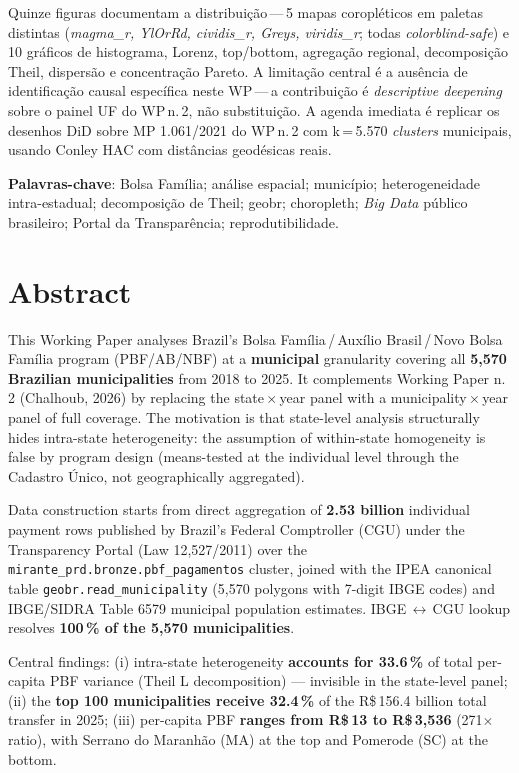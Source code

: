 \documentclass[12pt,a4paper,oneside]{article}
\begin{document}
Quinze figuras documentam a distribuição\,---\,5 mapas coropléticos em paletas
distintas (\textit{magma\_r, YlOrRd, cividis\_r, Greys, viridis\_r}; todas
\textit{colorblind-safe}) e 10 gráficos de histograma, Lorenz, top/bottom,
agregação regional, decomposição Theil, dispersão e concentração Pareto. A
limitação central é a ausência de identificação causal específica neste
WP\,---\,a contribuição é \textit{descriptive deepening} sobre o painel UF do
WP\,n.\,2, não substituição. A agenda imediata é replicar os desenhos DiD
sobre MP 1.061/2021 do WP\,n.\,2 com k\,=\,5.570 \textit{clusters}
municipais, usando Conley HAC com distâncias geodésicas reais.

\smallskip
\noindent\textbf{Palavras-chave}: Bolsa Família; análise espacial; município;
heterogeneidade intra-estadual; decomposição de Theil; geobr; choropleth;
\textit{Big Data} público brasileiro; Portal da Transparência;
reprodutibilidade.

\section*{Abstract}

This Working Paper analyses Brazil's Bolsa Família\,/\,Auxílio
Brasil\,/\,Novo Bolsa Família program (PBF/AB/NBF) at a \textbf{municipal}
granularity covering all \textbf{5{,}570 Brazilian municipalities} from
2018 to 2025. It complements Working Paper n.\,2 (Chalhoub, 2026) by
replacing the state\,$\times$\,year panel with a municipality\,$\times$\,year
panel of full coverage. The motivation is that state-level analysis
structurally hides intra-state heterogeneity: the assumption of within-state
homogeneity is false by program design (means-tested at the individual level
through the Cadastro Único, not geographically aggregated).

Data construction starts from direct aggregation of \textbf{2.53 billion}
individual payment rows published by Brazil's Federal Comptroller (CGU)
under the Transparency Portal (Law 12,527/2011) over the
\texttt{mirante\_prd.bronze.pbf\_pagamentos} cluster, joined with the IPEA
canonical table \texttt{geobr.read\_municipality} (5{,}570 polygons with
7-digit IBGE codes) and IBGE/SIDRA Table 6579 municipal population
estimates. IBGE\,$\leftrightarrow$\,CGU lookup resolves
\textbf{100\,\% of the 5{,}570 municipalities}.

Central findings: (i) intra-state heterogeneity \textbf{accounts for
33.6\,\%} of total per-capita PBF variance (Theil L decomposition) — invisible
in the state-level panel; (ii) the \textbf{top 100 municipalities receive
32.4\,\%} of the R\$\,156.4 billion total transfer in 2025; (iii) per-capita
PBF \textbf{ranges from R\$\,13 to R\$\,3{,}536} (271$\times$ ratio), with
Serrano do Maranhão (MA) at the top and Pomerode (SC) at the bottom.
\end{document}
